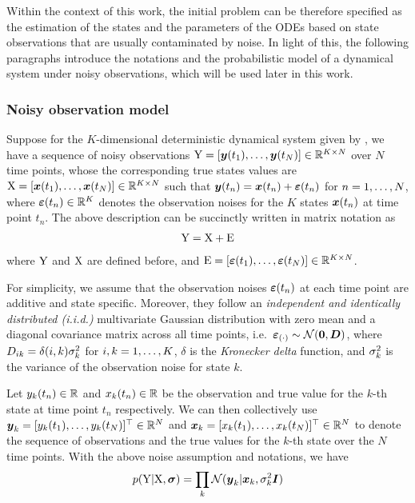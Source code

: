 Within the context of this work, the initial problem can be therefore specified as the estimation of the states and the parameters of the ODEs based on state observations that are usually contaminated by noise.
In light of this, the following paragraphs introduce the notations and the probabilistic model of a dynamical system under noisy observations, which will be used later in this work.

\subsubsection*{Noisy observation model}

Suppose for the $K$-dimensional deterministic dynamical system given by , we have a sequence of noisy observations $\mathrm{Y} = [\boldsymbol{y}(t_{1}),\dots,\boldsymbol{y}(t_{N})] \in \mathbb{R}^{K \times N}$ over $N$ time points, whose the corresponding true states values are $\mathrm{X} = [\boldsymbol{x}(t_{1}),\dots,\boldsymbol{x}(t_{N})] \in \mathbb{R}^{K \times N}$ such that $\boldsymbol{y}(t_{n}) = \boldsymbol{x}(t_{n}) + \boldsymbol{\varepsilon}(t_{n})$ for $n=1,\dots,N$, where $\boldsymbol{\varepsilon}(t_{n}) \in \mathbb{R}^K$ denotes the observation noises for the $K$ states $\boldsymbol{x}(t_{n})$ at time point $t_n$.
The above description can be succinctly written in matrix notation as
\begin{align}
    \mathrm{Y} = \mathrm{X} + \mathrm{E}
    \nonumber
\end{align}
where $\mathrm{Y}$ and $\mathrm{X}$ are defined before, and $\mathrm{E} = [\boldsymbol{\varepsilon}(t_{1}),\dots,\boldsymbol{\varepsilon}(t_{N})] \in \mathbb{R}^{K \times N}$.

For simplicity, we assume that the observation noises $\boldsymbol{\varepsilon}(t_{n})$ at each time point are additive and state specific. 
Moreover, they follow an \emph{independent and identically distributed (i.i.d.)} multivariate Gaussian distribution with zero mean and a diagonal covariance matrix across all time points, i.e.\ $\boldsymbol{\varepsilon}_{(\cdot)} \sim \mathcal{N}(\boldsymbol{0}, \boldsymbol{D})$, where $D_{ik} = \delta(i,k)\sigma_{k}^2$ for $i, k = 1,\dots,K$, $\delta$ is the \emph{Kronecker delta} function, and $\sigma_{k}^2$ is the variance of the observation noise for state $k$. 

Let $y_{k}(t_{n}) \in \mathbb{R}$ and $x_{k}(t_{n}) \in \mathbb{R}$ be the observation and true value for the $k$-th state at time point $t_n$ respectively. 
We can then collectively use $\boldsymbol{y}_{k} = [y_{k}(t_{1}),\dots,y_{k}(t_{N})]^\top \in \mathbb{R}^N$ and $\boldsymbol{x}_{k} = [x_{k}(t_{1}),\dots,x_{k}(t_{N})]^\top \in \mathbb{R}^N$ to denote the sequence of observations and the true values for the $k$-th state over the $N$ time points.
With the above noise assumption and notations, we have
\begin{align}
    p(\mathrm{Y}\vert\mathrm{X},\boldsymbol{\sigma}) 
    = \prod_k{
        \mathcal{N}(\boldsymbol{y}_{k}\vert\boldsymbol{x}_{k}, \sigma_{k}^2\boldsymbol{I})
        }
    \label{eq-ode-noise-model}        
\end{align}

